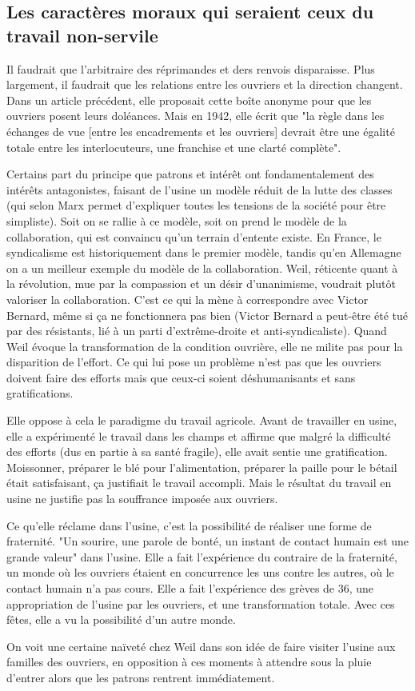 \documentclass[a4paper,12pt]{book}
\begin{document}
\subsection{Les caractères moraux qui seraient ceux du travail non-servile}
Il faudrait que l'arbitraire des réprimandes et ders renvois disparaisse. Plus largement, il faudrait que les relations entre les ouvriers et la direction changent. Dans un article précédent, elle proposait cette boîte anonyme pour que les ouvriers posent leurs doléances. Mais en 1942, elle écrit que "la règle dans les échanges de vue [entre les encadrements et les ouvriers] devrait être une égalité totale entre les interlocuteurs, une franchise et une clarté complète".
\par Certains part du principe que patrons et intérêt ont fondamentalement des intérêts antagonistes, faisant de l'usine un modèle réduit de la lutte des classes (qui selon Marx permet d'expliquer toutes les tensions de la société pour être simpliste). Soit on se rallie à ce modèle, soit on prend le modèle de la collaboration, qui est convaincu qu'un terrain d'entente existe. En France, le syndicalisme est historiquement dans le premier modèle, tandis qu'en Allemagne on a un meilleur exemple du modèle de la collaboration. Weil, réticente quant à la révolution, mue par la compassion et un désir d'unanimisme, voudrait plutôt valoriser la collaboration. C'est ce qui la mène à correspondre avec Victor Bernard, même si ça ne fonctionnera pas bien (Victor Bernard a peut-être été tué par des résistants, lié à un parti d'extrême-droite et anti-syndicaliste). Quand Weil évoque la transformation de la condition ouvrière, elle ne milite pas pour la disparition de l'effort. Ce qui lui pose un problème n'est pas que les ouvriers doivent faire des efforts mais que ceux-ci soient déshumanisants et sans gratifications.
\par Elle oppose à cela le paradigme du travail agricole. Avant de travailler en usine, elle a expérimenté le travail dans les champs et affirme que malgré la difficulté des efforts (dus en partie à sa santé fragile), elle avait sentie une gratification. Moissonner, préparer le blé pour l'alimentation, préparer la paille pour le bétail était satisfaisant, ça justifiait le travail accompli. Mais le résultat du travail en usine ne justifie pas la souffrance imposée aux ouvriers. 
\par Ce qu'elle réclame dans l'usine, c'est la possibilité de réaliser une forme de fraternité. "Un sourire, une parole de bonté, un instant de contact humain est une grande valeur" dans l'usine. Elle a fait l'expérience du contraire de la fraternité, un monde où les ouvriers étaient en concurrence les uns contre les autres, où le contact humain n'a pas cours. Elle a fait l'expérience des grèves de 36, une appropriation de l'usine par les ouvriers, et une transformation totale. Avec ces fêtes, elle a vu la possibilité d'un autre monde.
\par On voit une certaine naïveté chez Weil dans son idée de faire visiter l'usine aux familles des ouvriers, en opposition à ces moments à attendre sous la pluie d'entrer alors que les patrons rentrent immédiatement.
\end{document}

